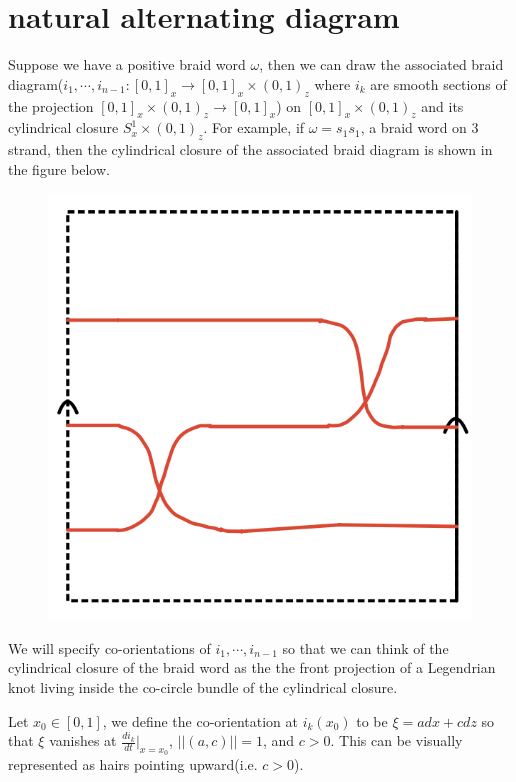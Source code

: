 \section{natural alternating diagram}

Suppose we have a positive braid word $\omega$, then we can draw the associated braid diagram($i_1,\cdots,i_{n-1}: [0,1]_{x}\rightarrow [0,1]_{x} \times (0,1)_{z}$ where $i_{k}$ are smooth sections of the projection $[0,1]_{x} \times (0,1)_{z} \rightarrow [0,1]_{x}$) on $[0,1]_{x} \times (0,1)_{z}$ and its cylindrical closure $S^{1}_{x} \times (0,1)_{z}$. For example, if $\omega = s_{1}s_{1}$, a braid word on $3$ strand, then the cylindrical closure of the associated braid diagram is shown in the figure below.

\begin{figure}[H] 
    \centering
    \includegraphics[scale = 0.95]{diagrams/natural_alternating_diagrams/1.png}
    \caption{}
    \label{fig:your-label}
\end{figure}


We will specify co-orientations of $i_1, \cdots, i_{n-1}$ so that we can think of the cylindrical closure of the braid word as the the front projection of a Legendrian knot living inside the co-circle bundle of the cylindrical closure.

Let $x_0 \in [0,1]$, we define the co-orientation at $i_k(x_0)$ to be $\xi = adx + cdz$ so that $\xi$ vanishes at $\frac{di_k}{dt}|_{x=x_0}$, $||(a,c)||= 1$, and $c>0$. This can be visually represented as hairs pointing upward(i.e. $c>0$).

